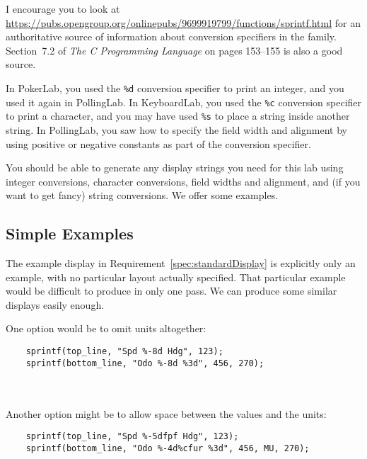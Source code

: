I encourage you to look at \url{https://pubs.opengroup.org/onlinepubs/9699919799/functions/sprintf.html} for an authoritative source of information about conversion specifiers in the  family.
Section~7.2 of \textit{The C Programming Language} on pages 153--155 is also a good source.

In PokerLab, you used the \lstinline{%d} conversion specifier to print an integer, and you used it again in PollingLab.
In KeyboardLab, you used the \lstinline{%c} conversion specifier to print a character, and you may have used \lstinline{%s} to place a string inside another string.
In PollingLab, you saw how to specify the field width and alignment by using positive or negative constants as part of the conversion specifier.

You should be able to generate any display strings you need for this lab using integer conversions, character conversions, field widths and alignment, and (if you want to get fancy) string conversions.
We offer some examples.

\subsection{Simple Examples}

The example display in Requirement~\ref{spec:standardDisplay} is explicitly only an example, with no particular layout actually specified.
That particular example would be difficult to produce in only one pass.
We can produce some similar displays easily enough.

One option would be to omit units altogether:
\begin{lstlisting}
    sprintf(top_line, "Spd %-8d Hdg", 123);
    sprintf(bottom_line, "Odo %-8d %3d", 456, 270);
\end{lstlisting} \phantom{x}\\
 \\

Another option might be to allow space between the values and the units:
\begin{lstlisting}
    sprintf(top_line, "Spd %-5dfpf Hdg", 123);
    sprintf(bottom_line, "Odo %-4d%cfur %3d", 456, MU, 270);
\end{lstlisting} \phantom{x}\\
 \\

